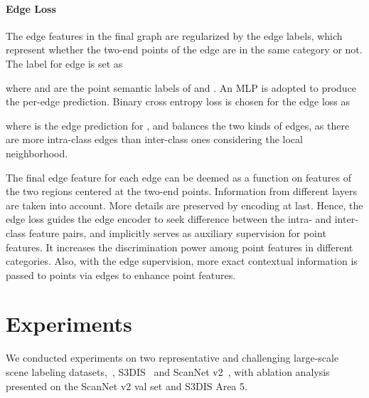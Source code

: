\documentclass[10pt,twocolumn,letterpaper]{article}
\begin{document}
\vspace{-0.12in}
\paragraph{Edge Loss} 
The edge features in the final graph  are regularized by the edge labels, which represent whether the two-end points of the edge are in the same category or not. The label for edge  is set as

where  and  are the point semantic labels of  and .
An MLP is adopted to produce the per-edge prediction. Binary cross entropy loss is chosen for the edge loss as

where  is the edge prediction for , and  balances the two kinds of edges, as there are more intra-class edges than inter-class ones considering the local neighborhood. 

The final edge feature for each edge can be deemed as a function on features of the two regions centered at the two-end points. Information from different layers are taken into account.
More details are preserved by encoding at last. Hence, the edge loss guides the edge encoder to seek difference between the intra- and inter-class feature pairs, and implicitly serves as auxiliary supervision for point features. It increases the discrimination power among point features in different categories. Also, with the edge supervision, more exact contextual information is passed to points via edges to enhance point features.

\section{Experiments}
We conducted experiments on two representative and challenging large-scale scene labeling datasets,~\ie, S3DIS~\cite{s3dis} and ScanNet v2~\cite{scannet}, with ablation analysis presented on the ScanNet v2 val set and S3DIS Area 5.
\end{document}
